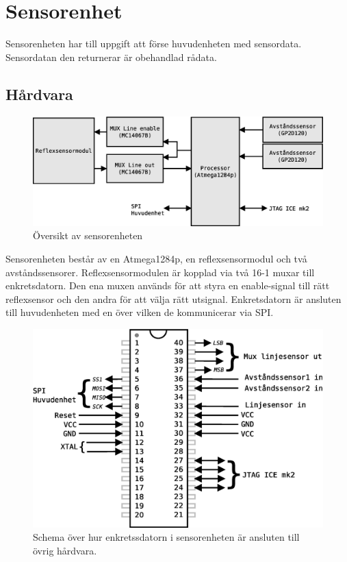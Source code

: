 
\section{Sensorenhet}

Sensorenheten har till uppgift att förse huvudenheten med sensordata. Sensordatan den returnerar är obehandlad rådata.

\subsection{Hårdvara}

\begin{figure}[h!]
	\centering
	\includegraphics[scale=0.4]{grafik/sensorenhet-oversikt}
	\caption{Översikt av sensorenheten }
\end{figure}

Sensorenheten består av en Atmega1284p, en reflexsensormodul och två avståndssensorer. Reflexsensormodulen är kopplad via två 16-1 muxar till enkretsdatorn. Den ena muxen används för att styra en enable-signal till rätt reflexsensor och den andra för att välja rätt utsignal. Enkretsdatorn är ansluten till huvudenheten med en  över vilken de kommunicerar via SPI.

\begin{figure}[h!]
	\centering
	\includegraphics[scale=0.5]{grafik/sensorenhet-processor}
	\caption{Schema över hur enkretssdatorn i sensorenheten är ansluten till övrig hårdvara.}
\end{figure}

